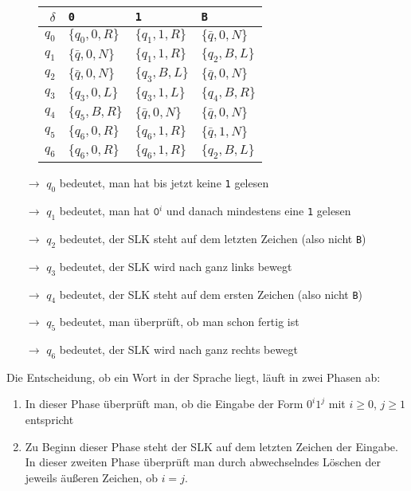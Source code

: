 \documentclass{scrartcl}%
\begin{document}
    \begin{figure}[htb]
        \centering
        \begin{tabular}{r|l|l|l}
            \textbf{\textsf{$\delta$}} & \texttt{0} & \texttt{1} & \texttt{B} \\
            \hline
            $q_0$ & $\{q_0, 0, R\}$ & $\{q_1, 1, R\}$ & $\{\bar{q}, 0, N \}$ \\
            $q_1$ & $\{\bar{q}, 0, N\}$ & $\{q_1, 1, R\}$ & $\{q_2, B, L \}$ \\
            \hline \hline
            $q_2$ & $\{\bar{q}, 0, N\}$ & $\{q_3, B, L\}$ & $\{\bar{q}, 0, N \}$ \\
            $q_3$ & $\{q_3, 0, L\}$ & $\{q_3, 1, L\}$ & $\{q_4, B, R \}$ \\
            $q_4$ & $\{q_5, B, R\}$ & $\{\bar{q}, 0, N\}$ & $\{\bar{q}, 0, N \}$ \\
            $q_5$ & $\{q_6, 0, R\}$ & $\{q_6, 1, R\}$ & $\{\bar{q}, 1, N \}$ \\
            $q_6$ & $\{q_6, 0, R\}$ & $\{q_6, 1, R\}$ & $\{q_2, B, L \}$ \\
        \end{tabular}
    \end{figure}
    \begin{itemize}
        \item [$\rightarrow$] $q_0$ bedeutet, man hat bis jetzt keine \texttt{1} gelesen
        \item [$\rightarrow$] $q_1$ bedeutet, man hat $\texttt{0}^i$ und danach mindestens eine \texttt{1} gelesen
        \item [$\rightarrow$] $q_2$ bedeutet, der SLK steht auf dem letzten Zeichen (also nicht \texttt{B})
        \item [$\rightarrow$] $q_3$ bedeutet, der SLK wird nach ganz links bewegt
        \item [$\rightarrow$] $q_4$ bedeutet, der SLK steht auf dem ersten Zeichen (also nicht \texttt{B})
        \item [$\rightarrow$] $q_5$ bedeutet, man überprüft, ob man schon fertig ist
        \item [$\rightarrow$] $q_6$ bedeutet, der SLK wird nach ganz rechts bewegt
    \end{itemize}

    Die Entscheidung, ob ein Wort in der Sprache liegt, läuft in zwei Phasen ab:
    \begin{enumerate}
        \item In dieser Phase überprüft man, ob die Eingabe der Form $0^{i}1^j$ mit $i \geq 0$, $j \geq 1$ entspricht
        \item Zu Beginn dieser Phase steht der SLK auf dem letzten Zeichen der Eingabe.
        In dieser zweiten Phase überprüft man durch abwechselndes Löschen der jeweils äußeren Zeichen, ob $i=j$.
    \end{enumerate}
\end{document}
